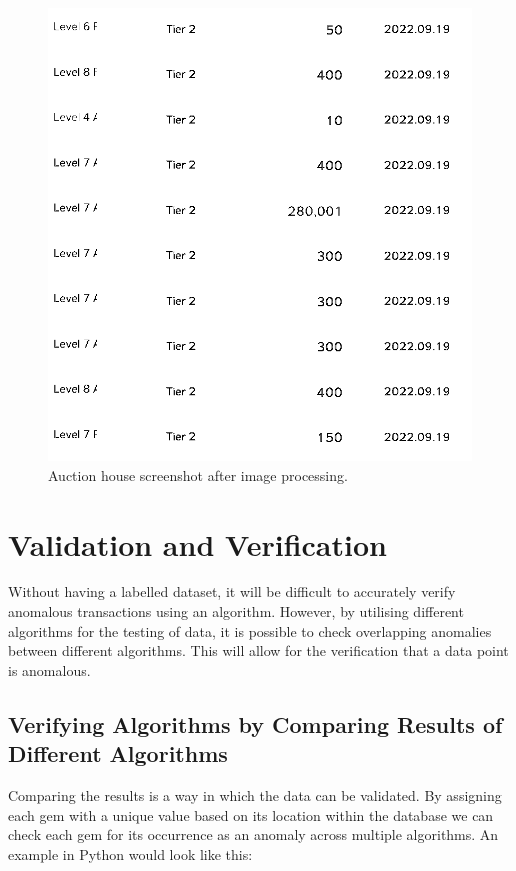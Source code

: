 \documentclass[journal]{IEEEtran}
\begin{document}
\begin{figure}[H]
    \centering
    \includegraphics[scale=0.25]{auction-house-after}
    \caption{Auction house screenshot after image processing.}
    \label{figure:auction-house-after}
\end{figure}

\section{Validation and Verification}
\noindent Without having a labelled dataset, it will be difficult to accurately verify anomalous transactions using an algorithm. However, by utilising different algorithms for the testing of data, it is possible to check overlapping anomalies between different algorithms. This will allow for the verification that a data point is anomalous.

\subsection{Verifying Algorithms by Comparing Results of Different Algorithms}
\noindent Comparing the results is a way in which the data can be validated. By assigning each gem with a unique value based on its location within the database we can check each gem for its occurrence as an anomaly across multiple algorithms. An example in Python would look like this:

\end{document}
